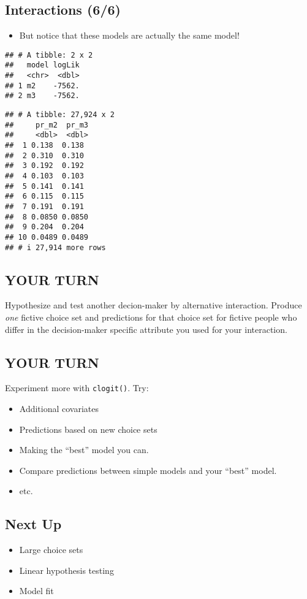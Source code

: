 \documentclass[
  11pt,
]{article}
\providecommand{\tightlist}{%
  \setlength{\itemsep}{0pt}\setlength{\parskip}{0pt}}
\begin{document}
\normalsize

\hypertarget{interactions-66}{%
\subsection{Interactions (6/6)}\label{interactions-66}}

\begin{itemize}
\tightlist
\item
  But notice that these models are actually the same model!
\end{itemize}

\footnotesize

\begin{verbatim}
## # A tibble: 2 x 2
##   model logLik
##   <chr>  <dbl>
## 1 m2    -7562.
## 2 m3    -7562.
\end{verbatim}

\normalsize

\footnotesize

\begin{verbatim}
## # A tibble: 27,924 x 2
##     pr_m2  pr_m3
##     <dbl>  <dbl>
##  1 0.138  0.138 
##  2 0.310  0.310 
##  3 0.192  0.192 
##  4 0.103  0.103 
##  5 0.141  0.141 
##  6 0.115  0.115 
##  7 0.191  0.191 
##  8 0.0850 0.0850
##  9 0.204  0.204 
## 10 0.0489 0.0489
## # i 27,914 more rows
\end{verbatim}

\normalsize

\hypertarget{your-turn-2}{%
\subsection{YOUR TURN}\label{your-turn-2}}

Hypothesize and test another decion-maker by alternative interaction.
Produce \emph{one} fictive choice set and predictions for that choice
set for fictive people who differ in the decision-maker specific
attribute you used for your interaction.

\hypertarget{your-turn-3}{%
\subsection{YOUR TURN}\label{your-turn-3}}

Experiment more with \texttt{clogit()}. Try:

\begin{itemize}
\tightlist
\item
  Additional covariates
\item
  Predictions based on new choice sets
\item
  Making the ``best'' model you can.
\item
  Compare predictions between simple models and your ``best'' model.
\item
  etc.
\end{itemize}

\hypertarget{next-up}{%
\subsection{Next Up}\label{next-up}}

\begin{itemize}
\tightlist
\item
  Large choice sets
\item
  Linear hypothesis testing
\item
  Model fit
\end{itemize}
\end{document}
